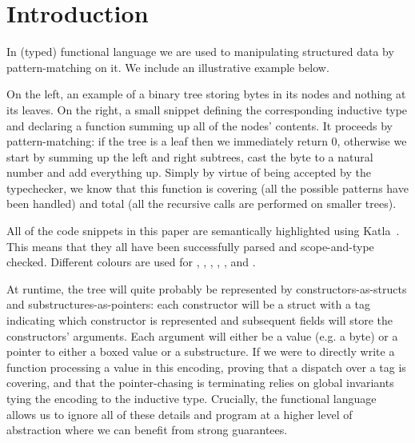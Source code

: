 \section{Introduction}\label{sec:intro}

In (typed) functional language we are used to manipulating
structured data by pattern-matching on it.
We include an illustrative example below.

\smallskip\noindent
\begin{minipage}{.45\textwidth}
  \begin{center}
    
  \end{center}
\end{minipage}\hfill
\begin{minipage}{.45\textwidth}
\end{minipage}
\smallskip

On the left, an example of a binary tree storing bytes in its nodes and
nothing at its leaves.
%
On the right, a small \idris{} snippet defining the corresponding
inductive type and declaring a function summing up all of the
nodes' contents.
%
It proceeds by pattern-matching:
%
if the tree is a leaf then we immediately return 0,
otherwise we start by summing up the left and right subtrees, cast the
byte to a natural number and add everything up.
%
Simply by virtue of being accepted by the typechecker, we know that
this function is covering (all the possible patterns have been handled)
and total (all the recursive calls are performed on smaller trees).

\begin{remark}
  All of the code snippets in this paper are semantically
  highlighted using Katla~\citep{MANUAL:repo/github/Katla23}.
  This means that they all have been successfully parsed
  and scope-and-type checked.
  Different colours are used for ,
  , ,
  , ,
  and .
\end{remark}

At runtime, the tree will quite probably be represented by
constructors-as-structs and substructures-as-pointers:
%
each constructor will be a struct with a tag indicating which
constructor is represented and subsequent fields will store
the constructors' arguments.
%
Each argument will either be a value (e.g. a byte) or a pointer
to either a boxed value or a substructure.
%
If we were to directly write a function processing a value in this
encoding, proving that a dispatch over a tag is covering, and that
the pointer-chasing is terminating relies on global invariants
tying the encoding to the inductive type.
%
Crucially, the functional language allows us to ignore all of these
details and program at a higher level of abstraction where we can
benefit from strong guarantees.

